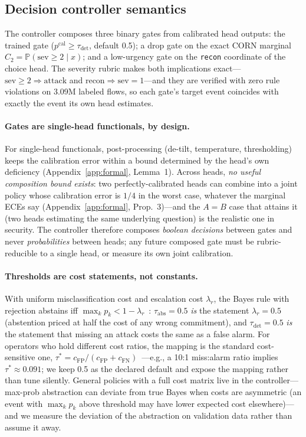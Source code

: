 \documentclass[sigconf,anonymous=false]{acmart}
\begin{document}
\subsection{Decision controller semantics}
\label{sec:gates}
The controller composes three binary gates from calibrated head outputs: the trained gate ($p^{\mathrm{cal}} \ge \tau_{\mathrm{det}}$, default 0.5); a drop gate on the exact CORN marginal $C_2 = \mathbb{P}(\mathrm{sev}\ge 2 \mid x)$; and a low-urgency gate on the \texttt{recon} coordinate of the choice head. The severity rubric makes both implications exact---$\mathrm{sev}\ge 2 \Rightarrow \text{attack}$ and $\text{recon} \Rightarrow \mathrm{sev}{=}1$---and they are verified with zero rule violations on 3.09M labeled flows, so each gate's target event coincides with exactly the event its own head estimates.

\paragraph{Gates are single-head functionals, by design.} For single-head functionals, post-processing (de-tilt, temperature, thresholding) keeps the calibration error within a bound determined by the head's own deficiency (Appendix~\ref{app:formal}, Lemma~1). Across heads, \emph{no useful composition bound exists}: two perfectly-calibrated heads can combine into a joint policy whose calibration error is $1/4$ in the worst case, whatever the marginal ECEs say (Appendix~\ref{app:formal}, Prop.~3)---and the $A{=}B$ case that attains it (two heads estimating the same underlying question) is the realistic one in security. The controller therefore composes \emph{boolean decisions} between gates and never \emph{probabilities} between heads; any future composed gate must be rubric-reducible to a single head, or measure its own joint calibration.

\paragraph{Thresholds are cost statements, not constants.} With uniform misclassification cost and escalation cost $\lambda_r$, the Bayes rule with rejection abstains iff $\max_k p_k < 1-\lambda_r$~\cite{chow1970,cortes2016rejection}: $\tau_{\mathrm{abs}}=0.5$ \emph{is} the statement $\lambda_r=0.5$ (abstention priced at half the cost of any wrong commitment), and $\tau_{\mathrm{det}}=0.5$ \emph{is} the statement that missing an attack costs the same as a false alarm. For operators who hold different cost ratios, the mapping is the standard cost-sensitive one, $\tau^{*} = c_{\mathrm{FP}}/(c_{\mathrm{FP}}{+}c_{\mathrm{FN}})$~\cite{elkan2001}---e.g., a 10:1 miss:alarm ratio implies $\tau^{*}\approx0.091$; we keep 0.5 as the declared default and expose the mapping rather than tune silently. General policies with a full cost matrix live in the controller---max-prob abstraction can deviate from true Bayes when costs are asymmetric (an event with $\max_k p_k$ above threshold may have lower expected cost elsewhere)---and we measure the deviation of the abstraction on validation data rather than assume it away.
\end{document}
